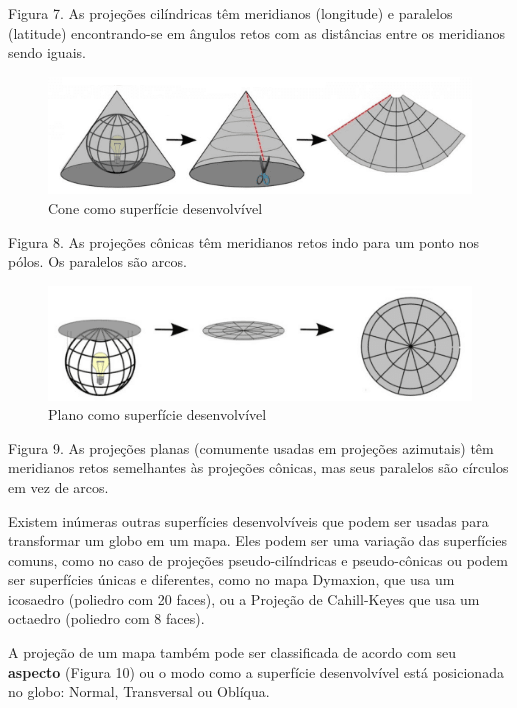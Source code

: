 \documentclass[
]{krantz}
\begin{document}
Figura 7. As projeções cilíndricas têm meridianos (longitude) e paralelos (latitude) encontrando-se em ângulos retos com as distâncias entre os meridianos sendo iguais.

\begin{figure}
\centering
\includegraphics{media/modulo0/cone.png}
\caption{Cone como superfície desenvolvível}
\end{figure}

Figura 8. As projeções cônicas têm meridianos retos indo para um ponto nos pólos. Os paralelos são arcos.

\begin{figure}
\centering
\includegraphics{media/modulo0/plane.png}
\caption{Plano como superfície desenvolvível}
\end{figure}

Figura 9. As projeções planas (comumente usadas em projeções azimutais) têm meridianos retos semelhantes às projeções cônicas, mas seus paralelos são círculos em vez de arcos.

Existem inúmeras outras superfícies desenvolvíveis que podem ser usadas para transformar um globo em um mapa. Eles podem ser uma variação das superfícies comuns, como no caso de projeções pseudo-cilíndricas e pseudo-cônicas ou podem ser superfícies únicas e diferentes, como no mapa Dymaxion, que usa um icosaedro (poliedro com 20 faces), ou a Projeção de Cahill-Keyes que usa um octaedro (poliedro com 8 faces).

A projeção de um mapa também pode ser classificada de acordo com seu \textbf{aspecto} (Figura 10) ou o modo como a superfície desenvolvível está posicionada no globo: Normal, Transversal ou Oblíqua.
\end{document}
